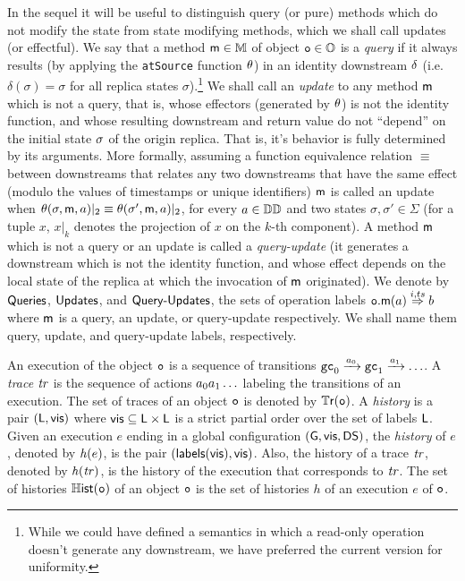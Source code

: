 In the sequel it will be useful to distinguish query (or pure) methods
which do not modify the state from state modifying methods, which we
shall call updates (or effectful).
%
We say that a method $\mathsf{m}\in\mathbb{M}$ of object $\mathtt{o}\in \mathbb{O}$
is a \emph{query} if it always results (by applying the {\tt atSource}
function $\theta$) in an identity downstream $\delta$ (i.e.
$\delta(\sigma)=\sigma$ for all replica states
$\sigma$).\footnote{While we could have defined a semantics in which a
  read-only operation doesn't generate any downstream, we have preferred
  the current version for uniformity.}
We shall call an \emph{update} to any method $\mathsf{m}$ which is not a query,
that is, whose effectors (generated by $\theta$) is not the
identity function, and whose resulting downstream and return value do
not ``depend'' on the initial state $\sigma$ of the origin replica.
That is, it's behavior is fully determined by its arguments.
More formally, assuming a function equivalence relation $\equiv$
between downstreams that relates any two downstreams that have the same
effect (modulo the values of timestamps or unique identifiers)
$\mathsf{m}$ is called an update when
$\theta(\sigma,\mathsf{m},a)|_2 \equiv
\theta(\sigma',\mathsf{m},a)|_2$, for every $a\in\mathbb{DD}$
and two states $\sigma,\sigma'\in\Sigma$ (for a tuple $x$, $x|_k$
denotes the projection of $x$ on the $k$-th component).
A method $\mathsf{m}$ which is not a query or an update is called a
\emph{query-update} (it generates a downstream which is not the
identity function, and whose effect depends on the local state of the
replica at which the invocation of $\mathsf{m}$ originated).
We denote by $\mathsf{Queries}$, $\mathsf{Updates}$, and $\mathsf{Query\text{-}Updates}$, the sets of
operation labels ${{\mathtt{o}.\mathsf{m}}}(a) \overset{i,ts}{\Rightarrow} b$ where $\mathsf{m}$
is a query, an update, or query-update respectively.
We shall name them query, update, and query-update labels,
respectively.

An execution of the object $\mathtt{o}$ is a sequence of transitions $\mathtt{gc}_0\xrightarrow{a_0}\mathtt{gc}_1\xrightarrow{a_1}\ldots$.
A \emph{trace} $\mathit{tr}$ is the sequence of actions $a_0a_1\ldots$ labeling the transitions of an execution.
The set of traces of an object $\mathtt{o}$ is denoted by $\mathbb{T}\mathsf{r}(\mathtt{o})$.
A \emph{history} is a pair $(\mathsf{L},\mathsf{vis})$ where
$\mathsf{vis}\subseteq \mathsf{L}\times\mathsf{L}$ is a strict partial
order over the set of labels $\mathsf{L}$.
Given an execution $e$ ending in a global configuration $(\mathsf{G},
\mathsf{vis}, \mathsf{DS})$, the \emph{history} of $e$, denoted by $\mathit{h}({e)}$, is the pair
$(\mathsf{labels}(\mathsf{vis}), \mathsf{vis})$. Also, the history of a trace $\mathit{tr}$, denoted by $\mathit{h}({\mathit{tr})}$,
is the history of the execution that corresponds to $\mathit{tr}$.
The set of histories $\mathbb{H}\mathsf{ist}(\mathtt{o})$ of an object $\mathtt{o}$ is the
set of histories $h$ of an execution $e$ of $\mathtt{o}$.

